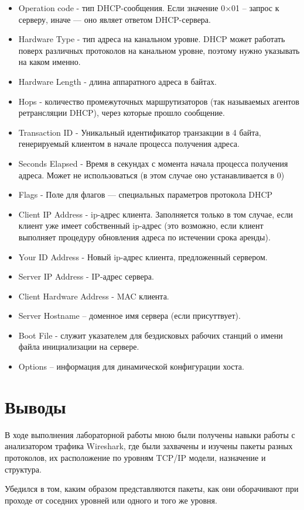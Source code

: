 \documentclass[12pt,onecolumn]{article}
\begin{document}
\begin{itemize}
    \item Operation code - тип DHCP-сообщения. Если значение 0×01 – запрос к серверу, иначе — оно являет ответом DHCP-сервера.
    \item Hardware Type - тип адреса на канальном уровне. DHCP может работать поверх различных протоколов на канальном уровне, поэтому нужно указывать на каком именно.
    \item Hardware Length - длина аппаратного адреса в байтах.
    \item Hops - количество промежуточных маршрутизаторов (так называемых агентов ретрансляции DHCP), через которые прошло сообщение.
    \item Transaction ID - Уникальный идентификатор транзакции в 4 байта, генерируемый клиентом в начале процесса получения адреса.
    \item Seconds Elapsed - Время в секундах с момента начала процесса получения адреса. Может не использоваться (в этом случае оно устанавливается в 0)
    \item Flags - Поле для флагов — специальных параметров протокола DHCP
    \item Client IP Address - ip-адрес клиента. Заполняется только в том случае, если клиент уже имеет собственный ip-адрес (это возможно, если клиент выполняет процедуру обновления адреса по истечении срока аренды).
    \item Your ID Address - Новый ip-адрес клиента, предложенный сервером.
    \item Server IP Address - IP-адрес сервера.
    \item Client Hardware Address - MAC клиента.
    \item Server Hostname – доменное имя сервера (если присуттвует).
    \item Boot File - служит указателем для бездисковых рабочих станций о имени файла инициализации на сервере.
    \item Options – информация для динамической конфигурации хоста.
\end{itemize}

\section{Выводы}
В ходе выполнения лабораторной работы мною были получены навыки работы с анализатором трафика
Wireshark, где были захвачены и изучены пакеты разных протоколов, их расположение по уровням TCP/IP
модели, назначение и структура. 

Убедился в том, каким образом представляются пакеты, как они оборачивают при проходе от соседних уровней или одного и того же уровня.
\end{document}
